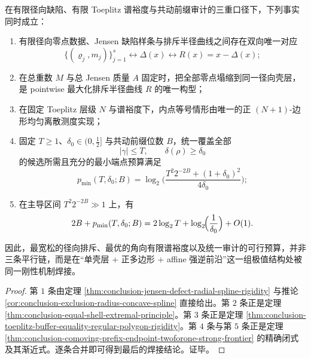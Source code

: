 \begin{theorem}\label{thm:conclusion-poisson-cauchy-jensen-audit-affine-welding}
在有限径向缺陷、有限 Toeplitz 谱裕度与共动前缀审计的三重口径下，下列事实同时成立：
\begin{enumerate}
  \item 有限径向零点数据、Jensen 缺陷样条与排斥半径曲线之间存在双向唯一对应
  \[
  \{(\varrho_j,m_j)\}_{j=1}^{s}
  \longleftrightarrow
  \Delta(x)
  \longleftrightarrow
  R(x)=x-\Delta(x);
  \]
  \item 在总重数 \(M\) 与总 Jensen 质量 \(A\) 固定时，把全部零点塌缩到同一径向壳层，是 pointwise 最大化排斥半径曲线 \(R\) 的唯一构型；
  \item 在固定 Toeplitz 层级 \(N\) 与谱裕度下，内点等号情形由唯一的正 \((N+1)\)-边形均匀离散测度实现；
  \item 固定 \(T\ge 1\)、\(\delta_0\in(0,\tfrac12]\) 与共动前缀位数 \(B\)，统一覆盖全部
  \[
  |\gamma|\le T,\qquad \delta(\rho)\ge \delta_0
  \]
  的候选所需且充分的最小端点预算满足
  \[
  p_{\min}(T,\delta_0;B)
  =
  \log_2\!\Biggl(
  \frac{T^2 2^{-2B}+(1+\delta_0)^2}{4\delta_0}
  \Biggr);
  \]
  \item 在主导区间 \(T^2 2^{-2B}\gg 1\) 上，有
  \[
  2B+p_{\min}(T,\delta_0;B)
  =
  2\log_2 T+\log_2\!\Bigl(\frac1{\delta_0}\Bigr)+O(1).
  \]
\end{enumerate}
因此，最宽松的径向排斥、最优的角向有限谱裕度以及统一审计的可行预算，并非三条平行链，而是在“单壳层 + 正多边形 + affine 强逆前沿”这一组极值结构处被同一刚性机制焊接。
\end{theorem}
\begin{proof}
第 \(1\) 条由定理 \ref{thm:conclusion-jensen-defect-radial-spline-rigidity} 与推论 \ref{cor:conclusion-exclusion-radius-concave-spline} 直接给出。第 \(2\) 条正是定理 \ref{thm:conclusion-equal-shell-extremal-principle}。第 \(3\) 条正是定理 \ref{thm:conclusion-toeplitz-buffer-equality-regular-polygon-rigidity}。第 \(4\) 条与第 \(5\) 条正是定理 \ref{thm:conclusion-comoving-prefix-endpoint-twoforone-strong-frontier} 的精确闭式及其渐近式。逐条合并即可得到最后的焊接结论。证毕。
\end{proof}

\endinput

